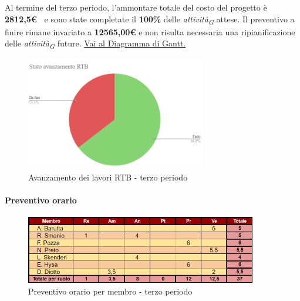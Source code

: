 \vspace{0.5cm}

Al termine del terzo periodo, l'ammontare totale del costo del progetto è \textbf{ 2812,5\euro\ } e sono state completate il \textbf{100\%} delle \textit{attività}\textsubscript{\textit{G}} attese.
Il preventivo a finire rimane invariato a \textbf{12565,00€} e non risulta necessaria una ripianificazione delle \textit{attività}\textsubscript{\textit{G}} future.
\href{https://github.com/orgs/ByteOps-swe/projects/3/views/1?sortedBy%5Bdirection%5D=asc&sortedBy%5BcolumnId%5D=64182560}{Vai al Diagramma di Gantt.}

\pagebreak

\begin{figure}[H]
    \centering
    \begin{minipage}[b]{0.70\textwidth}
        \centering
        \includegraphics[width=0.7\textwidth]{../Images/avanzamento3Periodo.png}
        \caption{Avanzamento dei lavori RTB - terzo periodo}
        \label{fig:Avanzamento_RTB_3}
    \end{minipage}
\end{figure}

\paragraph{Preventivo orario} 

\begin{figure}[H]
    \centering
    \includegraphics[width=0.9\textwidth]{../Images/preventivoOrario3Periodo.png}
    \caption{Preventivo orario per membro - terzo periodo}
    \label{fig:Preventivo_orario_3}
\end{figure}

